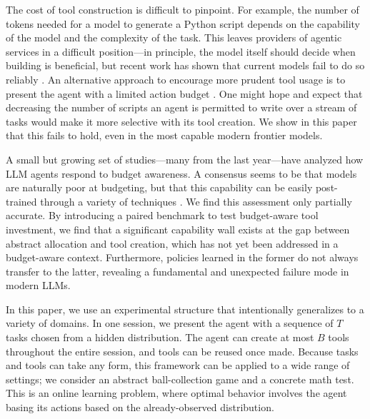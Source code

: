 \documentclass{article}
\begin{document}
The cost of tool construction is difficult to pinpoint. For example, the number of tokens needed for a model to generate a Python script depends on the capability of the model and the complexity of the task. This leaves providers of agentic services in a difficult position---in principle, the model itself should decide when building is beneficial, but recent work has shown that current models fail to do so reliably \citep{lin2026bagen}. An alternative approach to encourage more prudent tool usage is to present the agent with a limited action budget \citep{liu2025budgetaware}. One might hope and expect that decreasing the number of scripts an agent is permitted to write over a stream of tasks would make it more selective with its tool creation. We show in this paper that this fails to hold, even in the most capable modern frontier models.

A small but growing set of studies---many from the last year---have analyzed how LLM agents respond to budget awareness. A consensus seems to be that models are naturally poor at budgeting, but that this capability can be easily post-trained through a variety of techniques \citep{liu2025budgetaware, lin2026bagen, li2026bavt, ding2026calibrate}. We find this assessment only partially accurate. By introducing a paired benchmark to test budget-aware tool investment, we find that a significant capability wall exists at the gap between abstract allocation and tool creation, which has not yet been addressed in a budget-aware context. Furthermore, policies learned in the former do not always transfer to the latter, revealing a fundamental and unexpected failure mode in modern LLMs. 

In this paper, we use an experimental structure that intentionally generalizes to a variety of domains. In one session, we present the agent with a sequence of $T$ tasks chosen from a hidden distribution. The agent can create at most $B$ tools throughout the entire session, and tools can be reused once made. Because tasks and tools can take any form, this framework can be applied to a wide range of settings; we consider an abstract ball-collection game and a concrete math test. This is an online learning problem, where optimal behavior involves the agent basing its actions based on the already-observed distribution.
\end{document}

